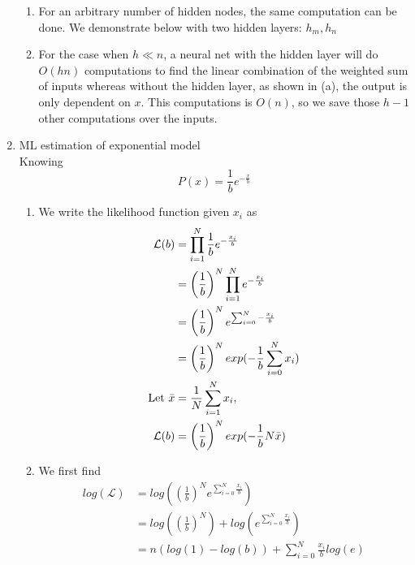 \documentclass{article}
\begin{document}
\begin{enumerate}
\begin{enumerate}
            \item %
                For an arbitrary number of hidden nodes, the same
                computation can be done. We demonstrate below with two
                hidden layers: \(h_m, h_n\)
            \item %
                For the case when \(h \ll n\), a neural net with the hidden
                layer will do \(O(hn)\) computations to find the linear
                combination of the weighted sum of inputs whereas without
                the hidden layer, as shown in (a), the output is only
                dependent on \(x\). This computations is \(O(n)\), so we 
                save those \(h-1\) other computations over the inputs.
        \end{enumerate}
    \item ML estimation of exponential model \\ %
        Knowing
        \begin{equation*}
            P(x) = \frac{1}{b}e^{-\frac{x}{b}}
        \end{equation*}
        \begin{enumerate}
            \item %
                We write the likelihood function given \(x_i\) as
                \begin{align*}
                \mathcal{L}(b) 
                &= \prod_{i = 1}^N \frac{1}{b}e^{-\frac{x_i}{b}}\\
                &= \left(\frac{1}{b}\right)^N \prod_{i=1}^N e^{-\frac{x_i}{b}}\\
                &= \left(\frac{1}{b}\right)^N e^{\sum_{i=0}^N -\frac{x_i}{b}}\\
                &= \left(\frac{1}{b}\right)^N exp(-\frac{1}{b}\sum_{i=0}^N x_i)\\
                \textnormal{Let } \bar{x} &= \frac{1}{N}\sum_{i=1}^Nx_i,\\
                \mathcal{L}(b) &= \left(\frac{1}{b}\right)^N exp(-\frac{1}{b}N\bar{x})
                \end{align*}

            \item %
                We first find
                \begin{align*}
                log(\mathcal{L}) 
                    &= log\left(\left(\frac{1}{b}\right)^N e^{\sum_{i=0}^N 
                        \frac{x_i}{b}}\right)\\
                    &= log\left(\left(\frac{1}{b}\right)^N\right) + 
                        log\left(e^{\sum_{i=0}^N \frac{x_i}{b}}\right)\\
                    &= n(log(1) - log(b)) + \sum_{i=0}^N \frac{x_i}{b}log(e)
                \end{align*}


\end{enumerate}
\end{enumerate}
\end{document}
